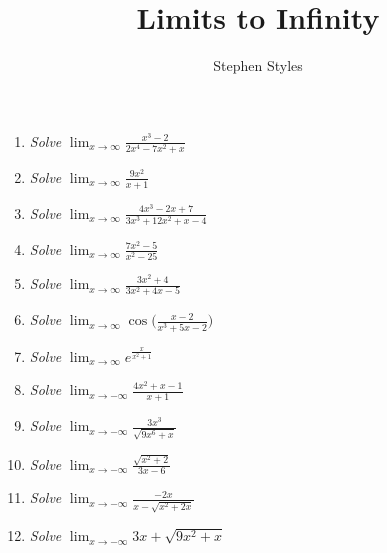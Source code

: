 \documentclass[16pt]{article}
\title{Limits to Infinity}
\author{Stephen Styles}
\theoremstyle{remark}
\begin{document}
\maketitle

\begin{enumerate}

\item \textit{Solve} $\displaystyle{\lim_{x \rightarrow \infty} \frac{x^3-2}{2x^4-7x^2+x} }$
\vspace{4cm}

\item \textit{Solve} $\displaystyle{\lim_{x \rightarrow \infty} \frac{9x^2}{x+1} }$
\vspace{4cm}

\item \textit{Solve} $\displaystyle{\lim_{x \rightarrow \infty} \frac{4x^3-2x+7}{3x^3+12x^2+x-4} }$
\vspace{4cm}

\item \textit{Solve} $\displaystyle{\lim_{x \rightarrow \infty} \frac{7x^2-5}{x^2-25} }$
\vspace{4cm}

\item \textit{Solve} $\displaystyle{\lim_{x \rightarrow \infty} \frac{3x^2+4}{3x^2+4x-5} }$
\vspace{4cm}

\item \textit{Solve} $\displaystyle{\lim_{x \rightarrow \infty} \cos\bigg( \frac{x-2}{x^3+5x-2} \bigg)}$
\vspace{4cm}

\item \textit{Solve} $\displaystyle{\lim_{x \rightarrow \infty} e^{\frac{x}{x^2+1} }}$
\vspace{4cm}

\item \textit{Solve} $\displaystyle{\lim_{x \rightarrow -\infty} \frac{4x^2+x-1}{x+1} }$
\vspace{4cm}

\item \textit{Solve} $\displaystyle{\lim_{x \rightarrow -\infty} \frac{3x^3}{\sqrt{9x^6+x}} }$
\vspace{4cm}

\item \textit{Solve} $\displaystyle{\lim_{x \rightarrow -\infty} \frac{\sqrt{x^2+2}}{3x-6} }$
\vspace{4cm}

\item \textit{Solve} $\displaystyle{\lim_{x \rightarrow -\infty} \frac{-2x}{x-\sqrt{x^2+2x}} }$
\vspace{4cm}

\item \textit{Solve} $\displaystyle{\lim_{x \rightarrow -\infty} 3x+\sqrt{9x^2+x} }$
\vspace{4cm}


\end{enumerate}
\end{document}
